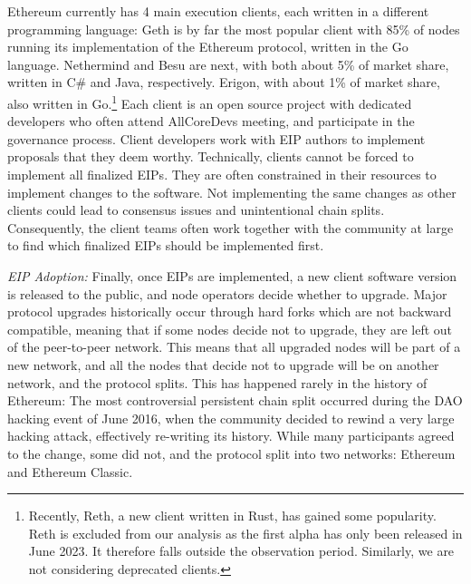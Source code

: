 \documentclass[No]{AEA}
\begin{document}
Ethereum currently has 4 main execution clients, each written in a different programming language: Geth is by far the most popular client with 85\% of nodes running its implementation of the Ethereum protocol, written in the Go language. Nethermind and Besu are next, with both about 5\% of market share, written in C\# and Java, respectively. Erigon, with about 1\% of market share, also written in Go.\footnote{Recently, Reth, a new client written in Rust, has gained some popularity. Reth is excluded from our analysis as the first alpha has only been released in June 2023. It therefore falls outside the observation period. Similarly, we are not considering deprecated clients.} Each client is an open source project with dedicated developers who often attend AllCoreDevs meeting, and participate in the governance process. Client developers work with EIP authors to implement proposals that they deem worthy. Technically, clients cannot be forced to implement all finalized EIPs. They are often constrained in their resources to implement changes to the software. Not implementing the same changes as other clients could lead to consensus issues and unintentional chain splits. Consequently, the client teams often work together with the community at large to find which finalized EIPs should be implemented first.

\textit{EIP Adoption:} Finally, once EIPs are implemented, a new client software version is released to the public, and node operators decide whether to upgrade. Major protocol upgrades historically occur through hard forks which are not backward compatible, meaning that if some nodes decide not to upgrade, they are left out of the peer-to-peer network. This means that all upgraded nodes will be part of a new network, and all the nodes that decide not to upgrade will be on another network, and the protocol splits. This has happened rarely in the history of Ethereum: The most controversial persistent chain split occurred during the DAO hacking event of June 2016, when the community decided to rewind a very large hacking attack, effectively re-writing its history. While many participants agreed to the change, some did not, and the protocol split into two networks: Ethereum and Ethereum Classic. 
\end{document}
